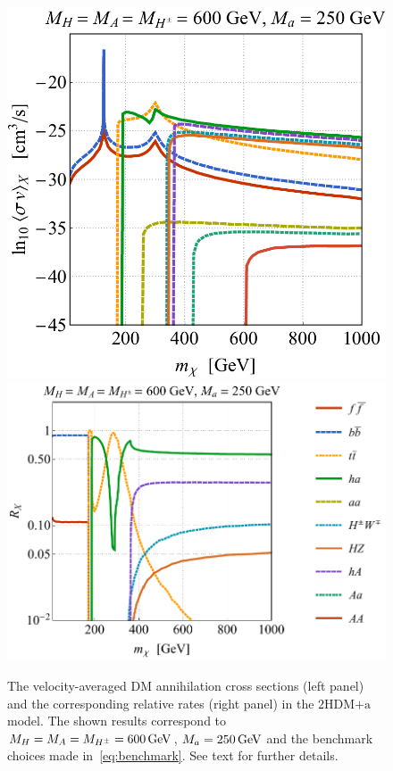 \documentclass[a4paper, 11pt,notoc]{article}
\newcommand{\hdma}{\ensuremath{\textrm{2HDM+a}}\xspace}
\begin{document}
\begin{figure}[t!]
\centering
\includegraphics[height=0.4\textwidth]{IDbenchmark.pdf} \quad 
\includegraphics[height=0.4\textwidth]{addIDbenchmark.pdf}
\vspace{4mm}
\caption{The velocity-averaged DM annihilation cross sections  (left panel) and the corresponding relative rates (right panel) in the \hdma model. The shown results correspond to $M_H = M_A = M_{H^\pm} = 600 \, {\rm GeV}$, $M_a = 250 \, {\rm GeV}$ and the benchmark choices made in~\eqref{eq:benchmark}. See text for further details. }
\label{fig:IDbenchmark}
\end{figure}
\end{document}
